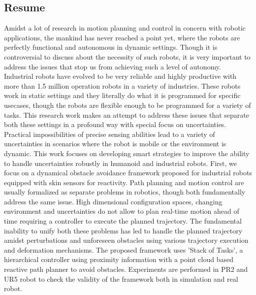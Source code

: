 \documentclass[english,a4paper,10pt,twoside]{StyleThese}
\begin{document}
\begin{vcenterpage}
{\section*{Resume}
}
Amidst a lot of research in motion planning and control in concern with robotic applications, the mankind has never reached a point yet, where the robots are perfectly functional and autonomous in dynamic settings. Though it is controversial to discuss about the necessity of such robots, it is very important to address the issues that stop us from achieving such a level of autonomy. Industrial robots have evolved to be very reliable and highly productive with more than 1.5 million operation robots in a variety of industries. These robots work in static settings and they literally do what it is programmed for specific usecases, though the robots are flexible enough to be programmed for a variety of tasks. This research work makes an attempt to address these issues that separate both these settings in a profound way with special focus on uncertainties. Practical impossibilities of precise sensing abilities lead to a variety of uncertainties in scenarios where the robot is mobile or the environment is dynamic. This work focuses on developing smart strategies to improve the ability to handle uncertainties robustly in humanoid and industrial robots. First, we focus on a dynamical obstacle avoidance framework proposed for industrial robots equipped with skin sensors for reactivity. Path planning and motion control are usually formalized as separate problems in robotics, though both fundamentally address the same issue. High dimensional configuration spaces, changing environment and uncertainties do not allow to plan real-time motion ahead of time requiring a controller to execute the planned trajectory. The fundamental inability to unify both these problems has led to handle the planned trajectory amidst perturbations and unforeseen obstacles using various trajectory execution and deformation mechanisms. The proposed framework uses 'Stack of Tasks', a hierarchical controller using proximity information with a point cloud based reactive path planner to avoid obstacles. Experiments are performed in PR2 and UR5 robot to check the validity of the framework both in simulation and real robot.


\end{vcenterpage}
\end{document}
